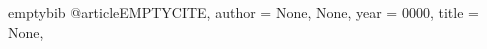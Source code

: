 \newcommand{\newglossaryentrywithacronym}[3]{
    \newglossaryentry{#1_gls}{
        name={#1},
        long={#2},
        description={#3}
    }

    \newglossaryentry{#1}{
        type=\acronymtype,
        name={#1},
        description={#2},
        first={#2 (#1)\glsadd{#1_gls}},
        see=[Glossary:]{#1_gls}
    }
}

\begin{filecontents}{emptybib}
@article{EMPTYCITE,
 author = {None, None},
 year = {0000},
 title = {None},
}
\end{filecontents}



\newcommand{\dubpar}{\vspace{1cm}}

\newcommand{\gfuss}[1]{\glqq#1\grqq}